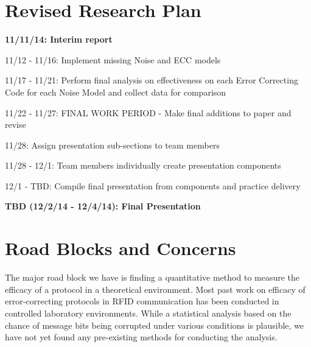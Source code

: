 \documentclass{sigcomm-alternate}
\begin{document}
\section{Revised Research Plan}

\textbf{11/11/14: Interim report}

11/12 - 11/16: Implement missing Noise and ECC models

11/17 - 11/21: Perform final analysis on effectiveness on each Error Correcting Code for each Noise Model and collect data for comparison

11/22 - 11/27: FINAL WORK PERIOD - Make final additions to paper and revise

11/28: Assign presentation sub-sections to team members

11/28 - 12/1: Team members individually create presentation components

12/1 - TBD: Compile final presentation from components and practice delivery

\textbf{TBD (12/2/14 - 12/4/14): Final Presentation}

\section{Road Blocks and Concerns}
The major road block we have is finding a quantitative method to measure the efficacy of a protocol in a theoretical environment. Most past work on efficacy of error-correcting protocols in RFID communication has been conducted in controlled laboratory environments. While a statistical analysis based on the chance of message bits being corrupted under various conditions is plausible, we have not yet found any pre-existing methods for conducting the analysis.

\nocite{*}

 

\balancecolumns
\end{document}
